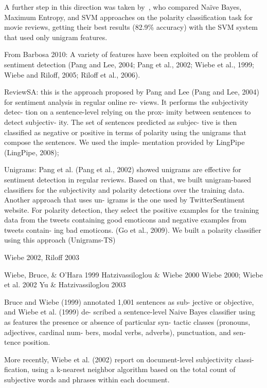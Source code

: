 A further step in this direction was taken by~\citet{Pang:02}, who
compared Na{\"i}ve Bayes, Maximum Entropy, and SVM approaches on the
polarity classification task for movie reviews, getting their best
results (82.9\% accuracy) with the SVM system that used only unigram
features.

\todo[inline]{}

From Barbosa 2010: A variety of features have been exploited on the
problem of sentiment detection (Pang and Lee, 2004; Pang et al., 2002;
Wiebe et al., 1999; Wiebe and Riloff, 2005; Riloff et al., 2006).

ReviewSA: this is the approach proposed by Pang and Lee (Pang and Lee,
2004) for sentiment analysis in regular online re- views. It performs
the subjectivity detec- tion on a sentence-level relying on the prox-
imity between sentences to detect subjectiv- ity. The set of sentences
predicted as subjec- tive is then classified as negative or positive
in terms of polarity using the unigrams that compose the sentences. We
used the imple- mentation provided by LingPipe (LingPipe, 2008);

Unigrams: Pang et al. (Pang et al., 2002) showed unigrams are
effective for sentiment detection in regular reviews. Based on that,
we built unigram-based classifiers for the subjectivity and polarity
detections over the training data. Another approach that uses un-
igrams is the one used by TwitterSentiment website. For polarity
detection, they select the positive examples for the training data
from the tweets containing good emoticons and negative examples from
tweets contain- ing bad emoticons. (Go et al., 2009). We built a
polarity classifier using this approach (Unigrams-TS)



Wiebe 2002, Riloff 2003

Wiebe, Bruce, \& O'Hara 1999
Hatzivassiloglou \& Wiebe 2000
Wiebe 2000;
Wiebe et al. 2002
Yu \& Hatzivassiloglou 2003

Bruce and Wiebe (1999) annotated 1,001 sentences as sub- jective or
objective, and Wiebe et al. (1999) de- scribed a sentence-level Naive
Bayes classifier using as features the presence or absence of
particular syn- tactic classes (pronouns, adjectives, cardinal num-
bers, modal verbs, adverbs), punctuation, and sen- tence position.

More recently, Wiebe et al.  (2002) report on document-level
subjectivity classi- fication, using a k-nearest neighbor algorithm
based on the total count of subjective words and phrases within each
document.

